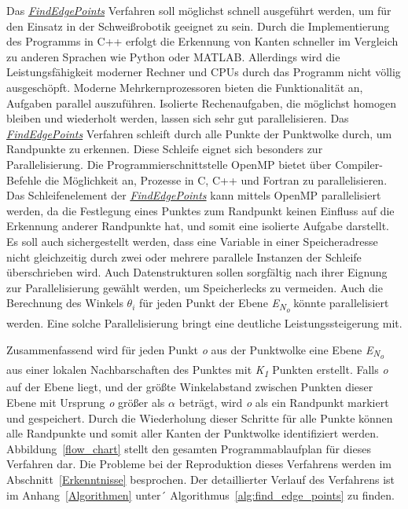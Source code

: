 Das \textit{\hyperref[alg:find_edge_points]{FindEdgePoints}} Verfahren soll möglichst schnell ausgeführt werden, um für den Einsatz in der Schweißrobotik geeignet zu sein. Durch die Implementierung des Programms in C++ erfolgt die Erkennung von Kanten schneller im Vergleich zu anderen Sprachen wie Python oder MATLAB. Allerdings wird die Leistungsfähigkeit moderner Rechner und CPUs durch das Programm nicht völlig ausgeschöpft. Moderne Mehrkernprozessoren bieten die Funktionalität an, Aufgaben parallel auszuführen. Isolierte Rechenaufgaben, die möglichst homogen bleiben und wiederholt werden, lassen sich sehr gut parallelisieren. Das \textit{\hyperref[alg:find_edge_points]{FindEdgePoints}} Verfahren schleift durch alle Punkte der Punktwolke durch, um Randpunkte zu erkennen. Diese Schleife eignet sich besonders zur Parallelisierung. Die Programmierschnittstelle OpenMP bietet über Compiler-Befehle die Möglichkeit an, Prozesse in C, C++ und Fortran zu parallelisieren. Das Schleifenelement der \textit{\hyperref[alg:find_edge_points]{FindEdgePoints}} kann mittels OpenMP parallelisiert werden, da die Festlegung eines Punktes zum Randpunkt keinen Einfluss auf die Erkennung anderer Randpunkte hat, und somit eine isolierte Aufgabe darstellt. Es soll auch sichergestellt werden, dass eine Variable in einer Speicheradresse nicht gleichzeitig durch zwei oder mehrere parallele Instanzen der Schleife überschrieben wird. Auch Datenstrukturen sollen sorgfältig nach ihrer Eignung zur Parallelisierung gewählt werden, um Speicherlecks zu vermeiden. Auch die Berechnung des Winkels $\theta_i$ für jeden Punkt der Ebene \textit{E\textsubscript{N\textsubscript{o}}} könnte parallelisiert werden. Eine solche Parallelisierung bringt eine deutliche Leistungssteigerung mit. 

Zusammenfassend wird für jeden Punkt \textit{o} aus der Punktwolke eine Ebene \textit{E\textsubscript{N\textsubscript{o}}} aus einer lokalen Nachbarschaften des Punktes mit \textit{K\textsubscript{1}} Punkten erstellt. Falls \textit{o} auf der Ebene liegt, und der größte Winkelabstand zwischen Punkten dieser Ebene mit Ursprung \textit{o} größer als $\alpha$ beträgt, wird \textit{o} als ein Randpunkt markiert und gespeichert. Durch die Wiederholung dieser Schritte für alle Punkte können alle Randpunkte und somit aller Kanten der Punktwolke identifiziert werden. Abbildung~\ref{flow_chart} stellt den gesamten Programmablaufplan für dieses Verfahren dar. Die Probleme bei der Reproduktion dieses Verfahrens werden im Abschnitt~\ref{Erkenntnisse} besprochen. Der detaillierter Verlauf des Verfahrens ist im Anhang~\ref{Algorithmen} unter´ Algorithmus~\ref{alg:find_edge_points} zu finden.


